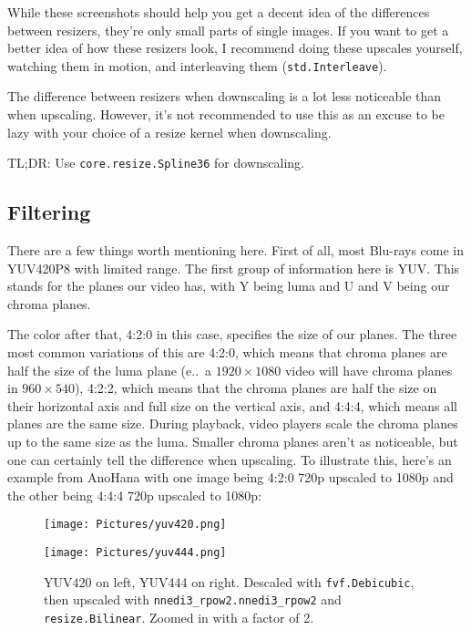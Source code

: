 \documentclass{scrartcl}
\begin{document}
While these screenshots should help you get a decent idea of the differences between resizers, they're only small parts of single images.  If you want to get a better idea of how these resizers look, I recommend doing these upscales yourself, watching them in motion, and interleaving them (\texttt{std.Interleave}).

The difference between resizers when downscaling is a lot less noticeable than when upscaling.  However, it's not recommended to use this as an excuse to be lazy with your choice of a resize kernel when downscaling.

TL;DR: Use \texttt{core.resize.Spline36} for downscaling.

\pagebreak

\subsection{Filtering}

There are a few things worth mentioning here.  First of all, most Blu-rays come in YUV420P8 with limited range.  The first group of information here is YUV.  This stands for the planes our video has, with Y being luma and U and V being our chroma planes.  

The color after that, 4:2:0 in this case, specifies the size of our planes.  The three most common variations of this are 4:2:0, which means that chroma planes are half the size of the luma plane (e.\@g.\ a $1920\times1080$ video will have chroma planes in $960\times540$), 4:2:2, which means that the chroma planes are half the size on their horizontal axis and full size on the vertical axis, and 4:4:4, which means all planes are the same size.  During playback, video players scale the chroma planes up to the same size as the luma.  Smaller chroma planes aren't as noticeable, but one can certainly tell the difference when upscaling.  To illustrate this, here's an example from AnoHana with one image being 4:2:0 720p upscaled to 1080p and the other being 4:4:4 720p upscaled to 1080p:

\begin{figure}[h]
\begin{minipage}{.5\textwidth}
\centering
\texttt{[image: Pictures/yuv420.png]}
\end{minipage}
\begin{minipage}{.5\textwidth}
\centering
\texttt{[image: Pictures/yuv444.png]}
\end{minipage}
\caption{YUV420 on left, YUV444 on right.  Descaled with \texttt{fvf.Debicubic}, then upscaled with \texttt{nnedi3\_rpow2.nnedi3\_rpow2} and \texttt{resize.Bilinear}.  Zoomed in with a factor of 2.}\label{fig:11}
\end{figure}
\end{document}
